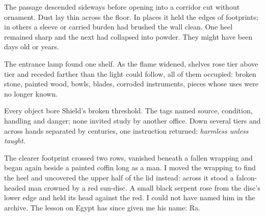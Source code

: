 \ornament

The passage descended sideways before opening into a corridor cut without ornament. Dust lay thin across the floor. In places it held the edges of footprints; in others a sleeve or carried burden had brushed the wall clean. One heel remained sharp and the next had collapsed into powder. They might have been days old or years.\par

The entrance lamp found one shelf. As the flame widened, shelves rose tier above tier and receded farther than the light could follow, all of them occupied: broken stone, painted wood, bowls, blades, corroded instruments, pieces whose uses were no longer known.\par

Every object bore Shield's broken threshold. The tags named source, condition, handling and danger; none invited study by another office. Down several tiers and across hands separated by centuries, one instruction returned: \textit{harmless unless taught.}\par

The clearer footprint crossed two rows, vanished beneath a fallen wrapping and began again beside a painted coffin long as a man. I moved the wrapping to find the heel and uncovered the upper half of the lid instead: across it stood a falcon-headed man crowned by a red sun-disc. A small black serpent rose from the disc's lower edge and held its head against the red. I could not have named him in the archive. The lesson on Egypt has since given me his name: Ra.\par

